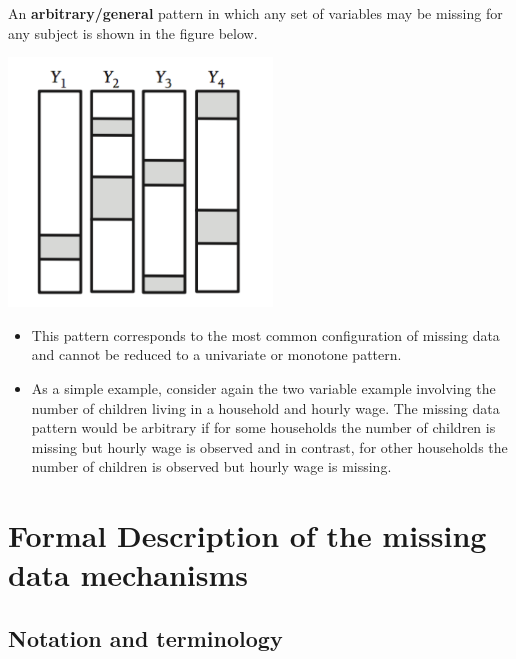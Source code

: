 \documentclass[11pt]{article}
\theoremstyle{break}
\begin{document}
\begin{definition}
    An \textbf{arbitrary/general} pattern in which any set of variables may
    be missing for any subject is shown in the figure below.
\end{definition}

\includegraphics[width=7cm]{3.png}

\begin{itemize}
    \item This pattern corresponds to the most common configuration of
        missing data and cannot be reduced to a univariate or monotone
        pattern.
    \item As a simple example, consider again the two variable example
        involving the number of children living in a household and hourly
        wage. The missing data pattern would be arbitrary if for some households
        the number of children is missing but hourly wage is observed and in
        contrast, for other households the number of children is observed
        but hourly wage is missing.
\end{itemize}




\section{Formal Description of the missing data mechanisms}

\subsection{Notation and terminology}
\end{document}
